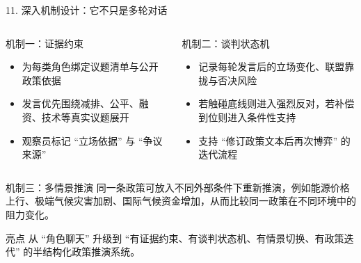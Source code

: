 \documentclass[aspectratio=169,10.5pt]{ctexbeamer}
\begin{document}
\begin{frame}{11. 深入机制设计：它不只是多轮对话}
  \begin{columns}[T]
    \begin{block}{机制一：证据约束}
      \begin{itemize}
        \item 为每类角色绑定议题清单与公开政策依据
        \item 发言优先围绕减排、公平、融资、技术等真实议题展开
        \item 观察员标记 ``立场依据'' 与 ``争议来源''
      \end{itemize}
    \end{block}
    \begin{block}{机制二：谈判状态机}
      \begin{itemize}
        \item 记录每轮发言后的立场变化、联盟靠拢与否决风险
        \item 若触碰底线则进入强烈反对，若补偿到位则进入条件性支持
        \item 支持 ``修订政策文本后再次博弈'' 的迭代流程
      \end{itemize}
    \end{block}
  \end{columns}
  \begin{block}{机制三：多情景推演}
    同一条政策可放入不同外部条件下重新推演，例如能源价格上行、极端气候灾害加剧、国际气候资金增加，从而比较同一政策在不同环境中的阻力变化。
  \end{block}
  \begin{alertblock}{亮点}
    从 ``角色聊天'' 升级到 ``有证据约束、有谈判状态机、有情景切换、有政策迭代'' 的半结构化政策推演系统。
  \end{alertblock}
\end{frame}
\end{document}
